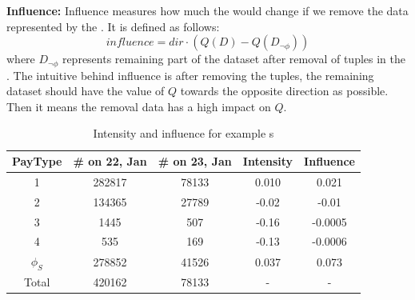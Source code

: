\textbf{Influence:}
Influence measures how much the {\fact} would change if we remove the data represented by the {\explanation}. 
It is defined as follows:
$$influence = dir \cdot (Q (D) - Q(D_{\neg \phi})) $$
where $D_{\neg \phi}$ represents remaining part of the dataset after removal of tuples in the {\explanation}. The intuitive behind influence is after removing the {\explanation} tuples, the remaining dataset should have the value of $Q$ towards the opposite direction as possible. Then it means the removal data has a high impact on $Q$. 

\begin{table}
	\centering
	\caption{Intensity and influence for example {\explanation}s}
	\begin{tabular}{|c|c|c|c|c|}
		\hline
		PayType & \# on 22, Jan & \# on 23, Jan & Intensity & Influence\\ \hline
		1 & 282817 & 78133 & 0.010& 0.021\\ \hline
		2 & 134365 & 27789  & -0.02& -0.01\\ \hline
		3 & 1445 & 507  & -0.16& -0.0005\\ \hline
		4 & 535 & 169  & -0.13& -0.0006\\ \hline
		$\phi_S$ & 278852 &  41526 & 0.037 & 0.073\\ \hline
		Total    & 420162 & 78133 &- & - \\ \hline            
	\end{tabular}
	\label{table:intensity_influence_example}
\end{table}


